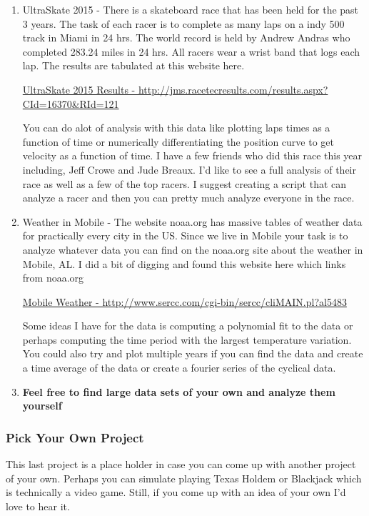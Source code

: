 \begin{enumerate}

\item UltraSkate 2015 - There is a skateboard race that has been held
  for the past 3 years. The task of each racer is to complete as many
  laps on a indy 500 track in Miami in 24 hrs. The world record is
  held by Andrew Andras who completed 283.24 miles in 24 hrs. All
  racers wear a wrist band that logs each lap. The results are
  tabulated at this website here.

  \href{http://jms.racetecresults.com/results.aspx?CId=16370\&RId=121}{UltraSkate
  2015 Results - http://jms.racetecresults.com/results.aspx?CId=16370\&RId=121}

  You can do alot of analysis with this data like plotting laps times
  as a function of time or numerically differentiating the position
  curve to get velocity as a function of time. I have a few friends
  who did this race this year including, Jeff Crowe and Jude
  Breaux. I'd like to see a full analysis of their race as well as a
  few of the top racers. I suggest creating a script that can analyze
  a racer and then you can pretty much analyze everyone in the race. 

\item Weather in Mobile - The website noaa.org has massive tables of
  weather data for practically every city in the US. Since we live in
  Mobile your task is to analyze whatever data you can find on the
  noaa.org site about the weather in Mobile, AL. I did a bit of digging and found this website here
  which links from noaa.org

  \href{http://www.sercc.com/cgi-bin/sercc/cliMAIN.pl?al5483}{Mobile
    Weather - http://www.sercc.com/cgi-bin/sercc/cliMAIN.pl?al5483}

  Some ideas I have for the data is computing a polynomial fit to the
  data or perhaps computing the time period with the largest
  temperature variation. You could also try and plot multiple years if
  you can find the data and create a time average of the data or
  create a fourier series of the cyclical data. 

\item {\bf Feel free to find large data sets of your own and analyze
  them yourself}

\end{enumerate}

\subsubsection{Pick Your Own Project}

This last project is a place holder in case you can come up with
another project of your own. Perhaps you can simulate playing Texas
Holdem or Blackjack which is technically a video game. Still, if you come up
with an idea of your own I'd love to hear it.


